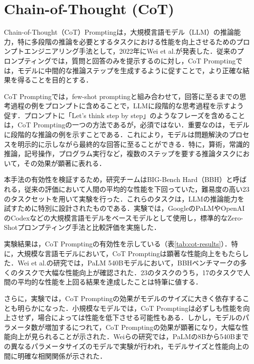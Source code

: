 \documentclass[11pt]{jreport}
\begin{document}
\section{Chain-of-Thought (CoT)}
Chain-of-Thought（CoT）Promptingは，大規模言語モデル（LLM）の推論能力，特に多段階の推論を必要とするタスクにおける性能を向上させるためのプロンプトエンジニアリング手法として，2022年にWei et al.\cite{CoT}が発表した．従来のプロンプティングでは，質問と回答のみを提示するのに対し，CoT Promptingでは，モデルに中間的な推論ステップを生成するように促すことで，より正確な結果を得ることを目的とする．

CoT Promptingでは，few-shot promptingと組み合わせて，回答に至るまでの思考過程の例をプロンプトに含めることで，LLMに段階的な思考過程を示すよう促す．プロンプトに「Let's think step by step」のようなフレーズを含めることは，CoT Promptingの一つの方法であるが，必須ではない．重要なのは，モデルに段階的な推論の例を示すことである．これにより，モデルは問題解決のプロセスを明示的に示しながら最終的な回答に至ることができる．特に，算術，常識的推論，記号操作，プログラム実行など，複数のステップを要する推論タスクにおいて，その効果が顕著に表れる．

本手法の有効性を検証するため，研究チームはBIG-Bench Hard（BBH）と呼ばれる，従来の評価において人間の平均的な性能を下回っていた，難易度の高い23のタスクセットを用いて実験を行った．これらのタスクは，LLMの推論能力を試すために特別に設計されたものである．実験では，GoogleのPaLMやOpenAIのCodexなどの大規模言語モデルをベースモデルとして使用し，標準的なZero-Shotプロンプティング手法と比較評価を実施した．

実験結果は，CoT Promptingの有効性を示している（表\ref{tab:cot-results}）．特に，大規模な言語モデルにおいて，CoT Promptingは顕著な性能向上をもたらした．Wei et al.の研究では，PaLM 540Bモデルにおいて，BBHベンチマークの多くのタスクで大幅な性能向上が確認された．23のタスクのうち，17のタスクで人間の平均的な性能を上回る結果を達成したことは特筆に値する．

さらに，実験では，CoT Promptingの効果がモデルのサイズに大きく依存することも明らかになった．小規模なモデルでは，CoT Promptingは必ずしも性能を向上させず，場合によっては性能を低下させる可能性もある．しかし，モデルのパラメータ数が増加するにつれて，CoT Promptingの効果が顕著になり，大幅な性能向上が見られることが示された．Weiらの研究では，PaLMの8Bから540Bまでの異なるパラメータサイズのモデルで実験が行われ，モデルサイズと性能向上の間に明確な相関関係が示された．
\end{document}
